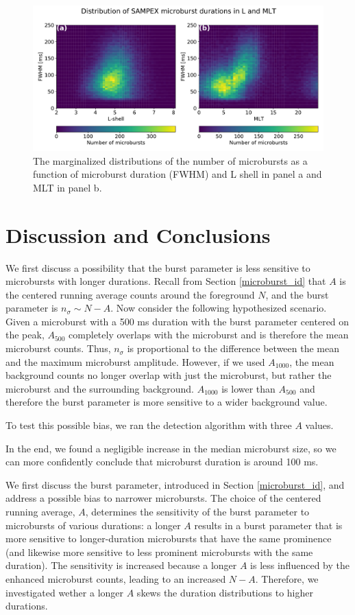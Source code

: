 \documentclass[draft]{agujournal2019}
\begin{document}
\begin{figure}
\noindent\includegraphics[width=\textwidth]{figures/fig4.pdf}
\caption{The marginalized distributions of the number of microbursts as a function of microburst duration (FWHM) and L shell in panel a and MLT in panel b.}
\label{fig4}
\end{figure}

\section{Discussion and Conclusions}\label{discussion}

We first discuss a possibility that the burst parameter is less sensitive to microbursts with longer durations. Recall from Section \ref{microburst_id} that $A$ is the centered running average counts around the foreground $N$, and the burst parameter is $n_\sigma \sim N - A$. Now consider the following hypothesized scenario. Given a microburst with a 500 ms duration with the burst parameter centered on the peak, $A_{500}$ completely overlaps with the microburst and is therefore the mean microburst counts. Thus, $n_\sigma$ is proportional to the difference between the mean and the maximum microburst amplitude. However, if we used $A_{1000}$, the mean background counts no longer overlap with just the microburst, but rather the microburst and the surrounding background. $A_{1000}$ is lower than $A_{500}$ and therefore the burst parameter is more sensitive to a wider background value.

To test this possible bias, we ran the detection algorithm with three $A$ values.

In the end, we found a negligible increase in the median microburst size, so we can more confidently conclude that microburst duration is around 100 ms.

We first discuss the burst parameter, introduced in Section \ref{microburst_id}, and address a possible bias to narrower microbursts. The choice of the centered running average, $A$, determines the sensitivity of the burst parameter to microbursts of various durations: a longer $A$ results in a burst parameter that is more sensitive to longer-duration microbursts that have the same prominence (and likewise more sensitive to less prominent microbursts with the same duration). The sensitivity is increased because a longer $A$ is less influenced by the enhanced microburst counts, leading to an increased $N-A$. Therefore, we investigated wether a longer $A$ skews the duration distributions to higher durations.
\end{document}
